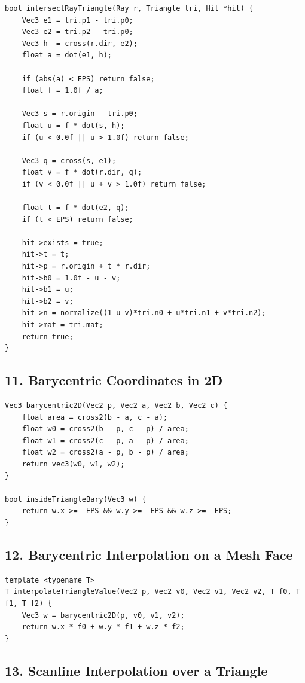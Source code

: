\documentclass[10pt,letterpaper]{article}
\begin{document}
\begin{verbatim}
bool intersectRayTriangle(Ray r, Triangle tri, Hit *hit) {
    Vec3 e1 = tri.p1 - tri.p0;
    Vec3 e2 = tri.p2 - tri.p0;
    Vec3 h  = cross(r.dir, e2);
    float a = dot(e1, h);

    if (abs(a) < EPS) return false;
    float f = 1.0f / a;

    Vec3 s = r.origin - tri.p0;
    float u = f * dot(s, h);
    if (u < 0.0f || u > 1.0f) return false;

    Vec3 q = cross(s, e1);
    float v = f * dot(r.dir, q);
    if (v < 0.0f || u + v > 1.0f) return false;

    float t = f * dot(e2, q);
    if (t < EPS) return false;

    hit->exists = true;
    hit->t = t;
    hit->p = r.origin + t * r.dir;
    hit->b0 = 1.0f - u - v;
    hit->b1 = u;
    hit->b2 = v;
    hit->n = normalize((1-u-v)*tri.n0 + u*tri.n1 + v*tri.n2);
    hit->mat = tri.mat;
    return true;
}
\end{verbatim}

\subsection{11. Barycentric Coordinates in 2D}

\begin{verbatim}
Vec3 barycentric2D(Vec2 p, Vec2 a, Vec2 b, Vec2 c) {
    float area = cross2(b - a, c - a);
    float w0 = cross2(b - p, c - p) / area;
    float w1 = cross2(c - p, a - p) / area;
    float w2 = cross2(a - p, b - p) / area;
    return vec3(w0, w1, w2);
}

bool insideTriangleBary(Vec3 w) {
    return w.x >= -EPS && w.y >= -EPS && w.z >= -EPS;
}
\end{verbatim}

\subsection{12. Barycentric Interpolation on a Mesh Face}

\begin{verbatim}
template <typename T>
T interpolateTriangleValue(Vec2 p, Vec2 v0, Vec2 v1, Vec2 v2, T f0, T f1, T f2) {
    Vec3 w = barycentric2D(p, v0, v1, v2);
    return w.x * f0 + w.y * f1 + w.z * f2;
}
\end{verbatim}

\subsection{13. Scanline Interpolation over a Triangle}
\end{document}
